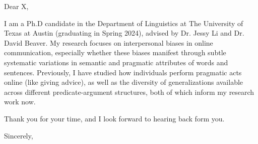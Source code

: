 \documentclass{practical-letter}
\begin{document}
\senderbox

\opening{Dear X,}


I am a Ph.D candidate in the Department of Linguistics at The University of Texas at Austin (graduating in Spring 2024), advised by Dr. Jessy Li and Dr. David Beaver. My research focuses on interpersonal biases in online communication, especially whether these biases manifest through subtle systematic variations in semantic and pragmatic attributes of words and sentences. Previously, I have studied how individuals perform pragmatic acts online (like giving advice), as well as the diversity of generalizations available across different predicate-argument structures, both of which inform my research work now.

Thank you for your time, and I look forward to hearing back form you.




\closing{Sincerely,}

\end{document}
